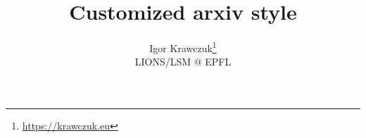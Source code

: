 \documentclass{article}
\title{Customized arxiv style}
\author{
    Igor Krawczuk\thanks{\url{https://krawczuk.eu}}\\
    LIONS/LSM @ EPFL
}
\begin{document}
\maketitle

\begin{abstract}
\lipsum[1]
\end{abstract}







\printbibliography
\printglossaries
\end{document}
